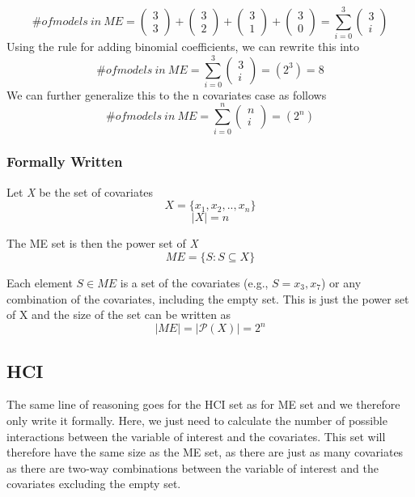 \[\# of models\ in\ ME=\left( \begin{array}{c}
3 \\ 
3 \end{array}
\right)+\left( \begin{array}{c}
3 \\ 
2 \end{array}
\right)+\left( \begin{array}{c}
3 \\ 
1 \end{array}
\right)+\left( \begin{array}{c}
3 \\ 
0 \end{array}
\right)=\sum^3_{i=0}{\left( \begin{array}{c}
3 \\ 
i \end{array}
\right)}\] 
Using the rule for adding binomial coefficients, we can rewrite this into
\[\# of models\ in\ ME=\sum^3_{i=0}{\left( \begin{array}{c}
3 \\ 
i \end{array}
\right)}=\left(2^3\right)=8\] 
We can further generalize this to the n covariates case as follows 
\[\# of models\ in\ ME=\sum^n_{i=0}{\left( \begin{array}{c}
n \\ 
i \end{array}
\right)}=\left(2^n\right)\] 

\subsubsection{Formally Written} \break 
\noindent Let \emph{X} be the set of covariates 
\[X=\{\left.x_1,x_2,..,x_n\right.\}\] 
\[\left|X\right|=n\] 


\noindent The ME set is then the power set of \emph{X} 
\[ME=\{\left.S:S\subseteq X\right.\}\] 

Each element $S\in ME$ is a set of the covariates (e.g., $S=\left.x_3,x_7\right.$) or any combination of the covariates, including the empty set. This is just the power set of X and the size of the set can be written as
\[\left|ME\right|=|\mathcal{P}\left(X\right)|=2^n\] 

\subsection{HCI}

The same line of reasoning goes for the HCI set as for ME set and we therefore only write it formally. Here, we just need to calculate the number of possible interactions between the variable of interest and the covariates. This set will therefore have the same size as the ME set, as there are just as many covariates as there are two-way combinations between the variable of interest and the covariates excluding the empty set.

